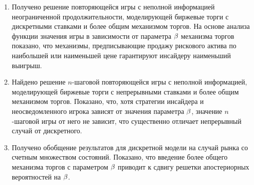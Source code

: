 \begin{enumerate}
  \item
    Получено решение повторяющейся игры с неполной информацией неограниченной продолжительности, моделирующей биржевые торги с дискретными ставками и более общим механизмом торгов.
    На основе анализа функции значения игры в зависимости от параметра $\beta$ механизма торгов показано, что механизмы, предписывающие продажу рискового актива по наибольшей или наименьшей цене гарантируют инсайдеру наименьший выигрыш.
  \item
    Найдено решение $n$-шаговой повторяющейся игры с неполной информацией, моделирующей биржевые торги с непрерывными ставками и более общим механизмом торгов.
    Показано, что, хотя стратегии инсайдера и неосведомленного игрока зависят от значения параметра $\beta$, значение $n$-шаговой игры от него не зависит, что существенно отличает непрерывный случай от дискретного.
  \item
    Получено обобщение результатов для дискретной модели на случай рынка со счетным множеством состояний.
    Показано, что введение более общего механизма торгов с параметром $\beta$ приводит к сдвигу решетки апостериорных вероятностей на $\beta$.
\end{enumerate}

